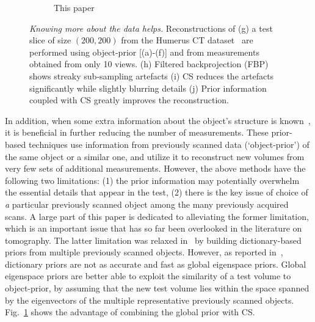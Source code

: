 \documentclass[journal]{IEEEtran}
\begin{document}
\begin{figure}[!h]
\begin{subfigure}[b]{0.23\linewidth}
        \caption{This paper}
     \end{subfigure}
    \caption{\textit{Knowing more about the data helps.} Reconstructions of (g) a test slice  of size $(200,200)$ from the Humerus CT dataset~\cite{humerus} are performed using object-prior [(a)-(f)] and from measurements obtained from only 10 views. (h) Filtered backprojection (FBP) shows streaky sub-sampling artefacts (i) CS reduces the artefacts significantly while slightly blurring details (j) Prior information coupled with CS greatly improves the reconstruction.}
\label{fig:diff_methods}
\end{figure}

In addition, when some extra information about the object's structure is known~\cite{PICCS,cardiacPICCS,lubner2011,pirple,mota2017}, it is beneficial in further reducing the number of measurements.  These prior-based techniques use information from previously scanned data (`object-prior') of the same object or a similar one, and utilize it to reconstruct new volumes from very few sets of additional measurements. However, the above methods have the following two limitations: (1) the prior information may potentially overwhelm the essential details that appear in the test, (2) there is the key issue of choice of \textit{a} particular previously scanned object among the many previously acquired scans. A large part of this paper is dedicated to alleviating the former limitation, which is an important issue that has so far been overlooked in the literature on tomography. The latter limitation was relaxed in~\cite{liu2016,Xu2012} by building dictionary-based priors from multiple previously scanned objects. However, as reported in~\cite{my_dicta_paper}, dictionary priors are not as accurate and fast as global eigenspace priors.  Global eigenspace priors are better able to exploit the similarity of a test volume to object-prior, by assuming that the new test volume lies within the space spanned by the eigenvectors of the multiple representative previously scanned objects. Fig.~\ref{fig:diff_methods} shows the advantage of combining the global prior with CS.
\end{document}
